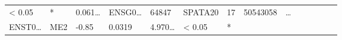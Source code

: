 \documentclass[
]{article}
\begin{document}
\begin{longtable}[]{@{}llllllllllllll@{}}
\begin{minipage}[t]{0.05\columnwidth}
\textless{} 0.05\strut
\end{minipage} & \begin{minipage}[t]{0.03\columnwidth}\raggedright
*\strut
\end{minipage} & \begin{minipage}[t]{0.05\columnwidth}\raggedright
0.061\ldots{}\strut
\end{minipage} & \begin{minipage}[t]{0.05\columnwidth}\raggedright
ENSG0\ldots{}\strut
\end{minipage} & \begin{minipage}[t]{0.05\columnwidth}\raggedright
64847\strut
\end{minipage} & \begin{minipage}[t]{0.05\columnwidth}\raggedright
SPATA20\strut
\end{minipage} & \begin{minipage}[t]{0.05\columnwidth}\raggedright
17\strut
\end{minipage} & \begin{minipage}[t]{0.05\columnwidth}\raggedright
50543058\strut
\end{minipage} & \begin{minipage}[t]{0.02\columnwidth}\raggedright
\ldots{}\strut
\end{minipage}\tabularnewline
\begin{minipage}[t]{0.05\columnwidth}\raggedright
ENST0\ldots{}\strut
\end{minipage} & \begin{minipage}[t]{0.04\columnwidth}\raggedright
ME2\strut
\end{minipage} & \begin{minipage}[t]{0.04\columnwidth}\raggedright
-0.85\strut
\end{minipage} & \begin{minipage}[t]{0.04\columnwidth}\raggedright
0.0319\strut
\end{minipage} & \begin{minipage}[t]{0.05\columnwidth}\raggedright
4.970\ldots{}\strut
\end{minipage} & \begin{minipage}[t]{0.05\columnwidth}\raggedright
\textless{} 0.05\strut
\end{minipage} & \begin{minipage}[t]{0.03\columnwidth}\raggedright
*\strut
\end{minipage} & \begin{minipage}[t]{0.05\columnwidth}\raggedright

\end{minipage}
\end{longtable}
\end{document}
